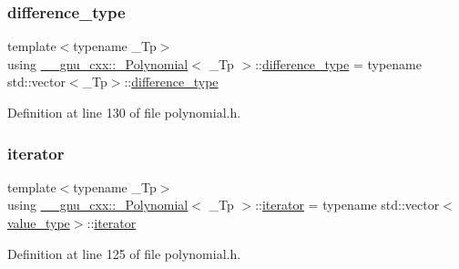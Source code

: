 \subsubsection{\texorpdfstring{difference\+\_\+type}{difference\_type}}
{\footnotesize\ttfamily template$<$typename \+\_\+\+Tp$>$ \\
using \hyperlink{class____gnu__cxx_1_1__Polynomial}{\+\_\+\+\_\+gnu\+\_\+cxx\+::\+\_\+\+Polynomial}$<$ \+\_\+\+Tp $>$\+::\hyperlink{class____gnu__cxx_1_1__Polynomial_aefb6d7ae1935b99a332d5b96b1e82d32}{difference\+\_\+type} =  typename std\+::vector$<$\+\_\+\+Tp$>$\+::\hyperlink{class____gnu__cxx_1_1__Polynomial_aefb6d7ae1935b99a332d5b96b1e82d32}{difference\+\_\+type}}



Definition at line 130 of file polynomial.\+h.

\mbox{\label{class____gnu__cxx_1_1__Polynomial_a64bd557b6af46992e352dbe9e30fa201}} 
\subsubsection{\texorpdfstring{iterator}{iterator}}
{\footnotesize\ttfamily template$<$typename \+\_\+\+Tp$>$ \\
using \hyperlink{class____gnu__cxx_1_1__Polynomial}{\+\_\+\+\_\+gnu\+\_\+cxx\+::\+\_\+\+Polynomial}$<$ \+\_\+\+Tp $>$\+::\hyperlink{class____gnu__cxx_1_1__Polynomial_a64bd557b6af46992e352dbe9e30fa201}{iterator} =  typename std\+::vector$<$\hyperlink{class____gnu__cxx_1_1__Polynomial_a725563351f50e76084a7a016c06f8a53}{value\+\_\+type}$>$\+::\hyperlink{class____gnu__cxx_1_1__Polynomial_a64bd557b6af46992e352dbe9e30fa201}{iterator}}



Definition at line 125 of file polynomial.\+h.

\mbox{\label{class____gnu__cxx_1_1__Polynomial_a876dcb9c1b92c4896a3f3b9f26e7e3df}} 
